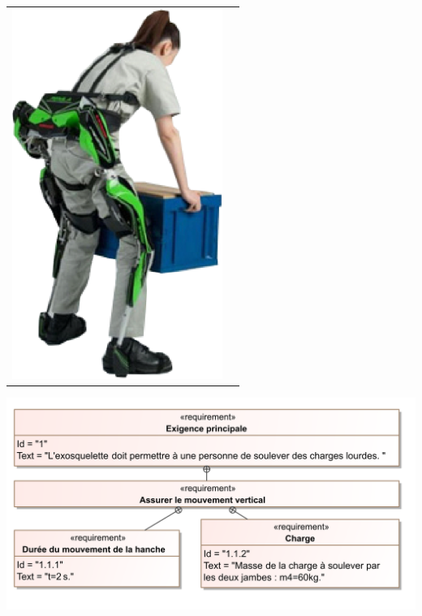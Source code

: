 \documentclass[10pt,fleqn]{article} %
\begin{document}
\begin{multicols}{2}
\begin{tabular}{m{.6\linewidth}m{.3\linewidth}}
\includegraphics[width=\linewidth]{images/fig_02}

\end{tabular}



\begin{center}
\includegraphics[width=\linewidth]{images/Exigences}
\end{center}
\fi


\end{multicols}
\end{document}
